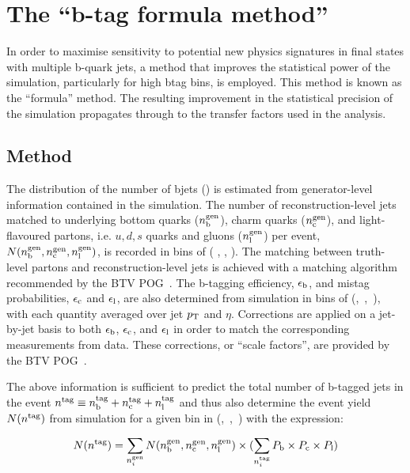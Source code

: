 \section{The ``b-tag formula method''}
\label{sec:formula}

In order to maximise sensitivity to potential new physics signatures
in final states with multiple b-quark jets, a method that improves the
statistical power of the simulation, particularly for high btag bins, is
employed. This method is known as the ``formula'' method. The
resulting improvement in the statistical precision of the simulation
propagates through to the transfer factors used in the analysis.

\subsection{Method}
\label{sec:formula-method}

The distribution of the number of bjets (\nb) is estimated from generator-level information
contained in the simulation. The number of reconstruction-level jets
matched to underlying bottom quarks ($n_{\text{b}}^{\rm gen}$), charm quarks
($n_{\rm c}^{\rm gen}$), and light-flavoured partons, i.e. $u,d,s$ quarks and gluons ($n_{\rm
  l}^{\rm gen}$) per event, $N(n_{\text{b}}^{\rm gen},n_{\rm c}^{\rm
  gen},n_{\rm l}^{\rm gen})$, is recorded in bins of (\njet
   , \scalht, \mht). 
 The matching between truth-level partons
and reconstruction-level jets is achieved with a matching algorithm
recommended by the BTV POG~\cite{btagMCTools}.
 The b-tagging efficiency, $\epsilon_{\rm b}$, and mistag probabilities,
$\epsilon_{\rm c}$ and $\epsilon_{\rm l}$, are also determined from simulation
in bins of (\njet,~\scalht,~\mht), with each quantity averaged
over jet $p_{\rm T}$ and $\eta$. Corrections are applied on a
jet-by-jet basis to both $\epsilon_{\rm b}$, $\epsilon_{\rm c}$, and $\epsilon_{\rm l}$
in order to match the corresponding measurements from
data. These corrections, or ``scale factors'', are provided by the BTV POG~\cite{btagMCTools}.

The above information is sufficient to predict the total number of b-tagged jets in the event $n^{\rm tag} \equiv n_{\rm b}^{\rm tag} + n_{\rm c}^{\rm tag} + n_{\rm l}^{\rm tag}$ and thus also
determine the event yield $N(n^{\rm tag})$ from simulation for a given
bin in (\njet,~\scalht,~\mht) with the expression:

\begin{equation}
  \label{equ:btag-formula}
  N(n^{\rm tag}) = \sum_{n_{i}^{\rm gen}} N(n_{\rm b}^{\rm gen},n_{\rm c}^{\rm gen},n_{\rm l}^{\rm gen}) \times (\sum_{n_{i}^{\rm tag}}P_{\rm b}\times P_{\rm c} \times P_{\rm l})
\end{equation}

